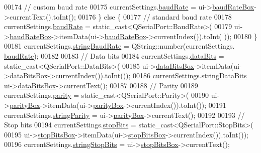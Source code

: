 \begin{DoxyCode}
{{{{{00174         \textcolor{comment}{// custom baud rate}
00175         currentSettings.\hyperlink{a00022_ac19cc9431552857a75c657a464ba0700}{baudRate} = ui->\hyperlink{a00029_a766a61db4a8c72219543f7c096ae5601}{baudRateBox}->currentText().toInt();
00176     \} \textcolor{keywordflow}{else} \{
00177         \textcolor{comment}{// standard baud rate}
00178         currentSettings.\hyperlink{a00022_ac19cc9431552857a75c657a464ba0700}{baudRate} = \textcolor{keyword}{static\_cast<}QSerialPort::BaudRate\textcolor{keyword}{>}(
00179                     ui->\hyperlink{a00029_a766a61db4a8c72219543f7c096ae5601}{baudRateBox}->itemData(ui->\hyperlink{a00029_a766a61db4a8c72219543f7c096ae5601}{baudRateBox}->currentIndex()).toInt(
      ));
00180     \}
00181     currentSettings.\hyperlink{a00022_a54e9d461f783386f314bc24b96665e53}{stringBaudRate} = QString::number(currentSettings.
      \hyperlink{a00022_ac19cc9431552857a75c657a464ba0700}{baudRate});
00182 
00183     \textcolor{comment}{// Data bits}
00184     currentSettings.\hyperlink{a00022_a7dcd85d028a09508cb4567cf631b40e9}{dataBits} = \textcolor{keyword}{static\_cast<}QSerialPort::DataBits\textcolor{keyword}{>}(
00185                 ui->\hyperlink{a00029_ab6082bb196e22af4ca04a04db3402166}{dataBitsBox}->itemData(ui->\hyperlink{a00029_ab6082bb196e22af4ca04a04db3402166}{dataBitsBox}->currentIndex()).toInt());
00186     currentSettings.\hyperlink{a00022_ab589b733b78af17744ab75067bfce051}{stringDataBits} = ui->\hyperlink{a00029_ab6082bb196e22af4ca04a04db3402166}{dataBitsBox}->currentText();
00187 
00188     \textcolor{comment}{// Parity}
00189     currentSettings.\hyperlink{a00022_ae08a00aa2e45218dade9046e3624cce7}{parity} = \textcolor{keyword}{static\_cast<}QSerialPort::Parity\textcolor{keyword}{>}(
00190                 ui->\hyperlink{a00029_a88c0b5d1f96a308ab115937b090f7bba}{parityBox}->itemData(ui->\hyperlink{a00029_a88c0b5d1f96a308ab115937b090f7bba}{parityBox}->currentIndex()).toInt());
00191     currentSettings.\hyperlink{a00022_aa2c662b2fb315f038e827d63d83b059b}{stringParity} = ui->\hyperlink{a00029_a88c0b5d1f96a308ab115937b090f7bba}{parityBox}->currentText();
00192 
00193     \textcolor{comment}{// Stop bits}
00194     currentSettings.\hyperlink{a00022_ab88ff384f7c1127bcbe2dd97b49696a4}{stopBits} = \textcolor{keyword}{static\_cast<}QSerialPort::StopBits\textcolor{keyword}{>}(
00195                 ui->\hyperlink{a00029_ad61890c5fd0acc9e72385efd02df90c0}{stopBitsBox}->itemData(ui->\hyperlink{a00029_ad61890c5fd0acc9e72385efd02df90c0}{stopBitsBox}->currentIndex()).toInt());
00196     currentSettings.\hyperlink{a00022_abde3c8410f779688ce6c2fcbbbb84f10}{stringStopBits} = ui->\hyperlink{a00029_ad61890c5fd0acc9e72385efd02df90c0}{stopBitsBox}->currentText();
}}}}}
\end{DoxyCode}
